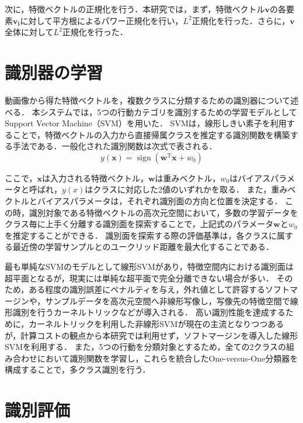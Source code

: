 次に，特徴ベクトルの正規化を行う．本研究では，まず，特徴ベクトル$ \bm{v} $の各要素$ \bm{v_i} $に対して平方根によるパワー正規化を行い，$ L^2 $正規化を行った．さらに，$ \bm{v} $全体に対して$ L^2 $正規化を行った．

\newpage
\section{識別器の学習}
動画像から得た特徴ベクトルを，複数クラスに分類するための識別器について述べる．
本システムでは，5つの行動カテゴリを識別するための学習モデルとしてSupport Vector Machine（SVM）を用いた．
SVMは，線形しきい素子を利用することで，特徴ベクトルの入力から直接帰属クラスを推定する識別関数を構築する手法である．一般化された識別関数は次式で表される．
%
\begin{equation}
{
  y(\bm{x})=\operatorname{sign}(\bm{w}^{\mathrm{T}}\bm{x}+w_0)
}
\end{equation}

ここで，$ \bm{x} $は入力される特徴ベクトル，$ \bm{w} $は重みベクトル，$ w_0 $はバイアスパラメータと呼ばれ，$ y(x) $はクラスに対応した2値のいずれかを取る．
また，重みベクトルとバイアスパラメータは，それぞれ識別面の方向と位置を決定する．
この時，識別対象である特徴ベクトルの高次元空間において，多数の学習データをクラス毎に上手く分離する識別面を探索することで，上記式のパラメータ$ \bm{w} $と$ w_0 $を推定することができる．
識別面を探索する際の評価基準は，各クラスに属する最近傍の学習サンプルとのユークリッド距離を最大化することである．

最も単純なSVMのモデルとして線形SVMがあり，特徴空間内における識別面は超平面となるが，現実には単純な超平面で完全分離できない場合が多い．
そのため，ある程度の識別誤差にペナルティを与え，外れ値として許容するソフトマージンや，サンプルデータを高次元空間へ非線形写像し，写像先の特徴空間で線形識別を行うカーネルトリックなどが導入される．
高い識別性能を達成するために，カーネルトリックを利用した非線形SVMが現在の主流となりつつあるが，計算コストの観点から本研究では利用せず，ソフトマージンを導入した線形SVMを利用する．
また，5つの行動を分類対象とするため，全ての2クラスの組み合わせにおいて識別関数を学習し，これらを統合したOne-versus-One分類器を構成することで，多クラス識別を行う．

\section{識別評価}

